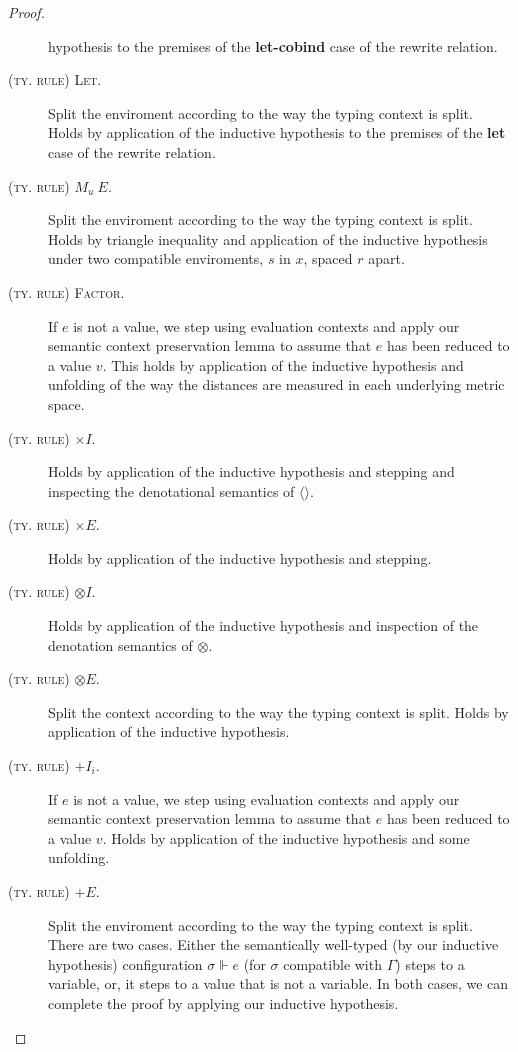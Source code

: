 \begin{proof}
\begin{description}
    hypothesis to the premises of the \textbf{let-cobind} case of the rewrite
    relation.
  \item[\textsc{(ty. rule) Let.}] Split the enviroment according to the way the
    typing context is split. Holds by application of the inductive hypothesis to
    the premises of the \textbf{let} case of the rewrite relation.
  \item[\textsc{(ty. rule) $M_u \ E$.}] Split the enviroment according to the
    way the typing context is split. Holds by triangle inequality and
    application of the inductive hypothesis under two compatible enviroments,
    $s$ in $x$, spaced $r$ apart.
  \item[\textsc{(ty. rule) Factor.}]
    If $e$ is not a value, we step using evaluation contexts and apply our
    semantic context preservation lemma to assume that $e$ has been reduced to a
    value $v$.
    This holds by application of the inductive hypothesis and unfolding of the way
    the distances are measured in each underlying metric space.
  \item[\textsc{(ty. rule) $\times I$.}] Holds by application of the inductive
    hypothesis and stepping and inspecting the denotational semantics of
    $\langle \rangle$.
  \item[\textsc{(ty. rule) $\times E$.}] Holds by application of the inductive
    hypothesis and stepping.
  \item[\textsc{(ty. rule) $\otimes I$.}] Holds by application of the inductive
    hypothesis and inspection of the denotation semantics of $\otimes$.
  \item[\textsc{(ty. rule) $\otimes E$.}] Split the context according to the way
    the typing context is split. Holds by application of the inductive
    hypothesis.
  \item[\textsc{(ty. rule) $+ I_i$.}]
    If $e$ is not a value, we step using evaluation contexts and apply our
    semantic context preservation lemma to assume that $e$ has been reduced to a
    value $v$.
    Holds by application of the inductive hypothesis and some unfolding.
  \item[\textsc{(ty. rule) $+ E$.}] Split the enviroment according to the way
    the typing context is split. There are two cases. Either the semantically
    well-typed (by our inductive hypothesis) configuration $\sigma \Vdash e$
    (for $\sigma$ compatible with $\Gamma$) steps to a variable, or, it steps to
    a value that is not a variable. In both cases, we can complete the proof by
    applying our inductive hypothesis.

\end{description}
\end{proof}
